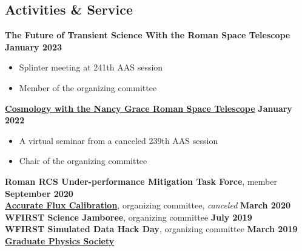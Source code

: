 \documentclass[margin]{res}
\begin{document}
\begin{resume}
\section{Activities \& Service} %


\textbf{The Future of Transient Science With the Roman Space Telescope} \hfill \textbf{January 2023}
\begin{itemize}\itemsep -2pt
    \item[] Splinter meeting at 241th AAS session
    \item[] Member of the organizing committee
\end{itemize} \vspace{-12pt}
\textbf{\href{https://roman.gsfc.nasa.gov/science/2022_cosmology_seminar.html}{Cosmology with the Nancy Grace Roman Space Telescope}} \hfill \textbf{January 2022}
\begin{itemize}\itemsep -2pt
    \item[] A virtual seminar from a canceled 239th AAS session
    \item[] Chair of the organizing committee
\end{itemize} \vspace{-12pt}
\textbf{Roman RCS Under-performance Mitigation Task Force}, member \hfill \textbf{September 2020}\\
\textbf{\href{https://www.stsci.edu/contents/events/stsci/2020/march/accurate-flux-calibration-for-21st-century-astrophysics?timeframe=}{Accurate Flux Calibration}}, organizing committee, \textit{canceled} \hfill \textbf{March 2020}\\
\textbf{WFIRST Science Jamboree}, organizing committee \hfill \textbf{July 2019}\\
\textbf{WFIRST Simulated Data Hack Day}, organizing committee \hfill \textbf{March 2019}\\
\textbf{\href{gradphysics.nd.edu}{Graduate Physics Society}}

\end{resume}
\end{document}

